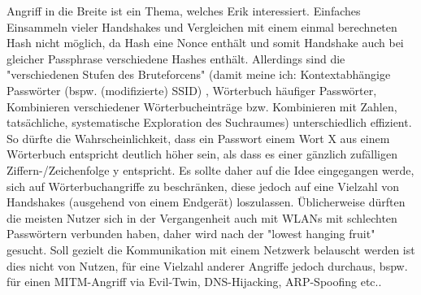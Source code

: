 Angriff in die Breite ist ein Thema, welches Erik interessiert. Einfaches Einsammeln vieler Handshakes und Vergleichen mit einem einmal berechneten Hash nicht möglich, da Hash eine Nonce enthält und somit Handshake auch bei gleicher Passphrase verschiedene Hashes enthält. Allerdings sind die "verschiedenen Stufen des Bruteforcens" (damit meine ich: Kontextabhängige Passwörter (bspw. (modifizierte) SSID) , Wörterbuch häufiger Passwörter, Kombinieren verschiedener Wörterbucheinträge bzw. Kombinieren mit Zahlen, tatsächliche, systematische Exploration des Suchraumes) unterschiedlich effizient. So dürfte die Wahrscheinlichkeit, dass ein Passwort einem Wort X aus einem Wörterbuch entspricht deutlich höher sein, als dass es einer gänzlich zufälligen Ziffern-/Zeichenfolge y entspricht. Es sollte daher auf die Idee eingegangen werde, sich auf Wörterbuchangriffe zu beschränken, diese jedoch auf eine Vielzahl von Handshakes (ausgehend von einem Endgerät) loszulassen. Üblicherweise dürften die meisten Nutzer sich in der Vergangenheit auch mit WLANs mit schlechten Passwörtern verbunden haben, daher wird nach der "lowest hanging fruit" gesucht. Soll gezielt die Kommunikation mit einem Netzwerk belauscht werden ist dies nicht von Nutzen, für eine Vielzahl anderer Angriffe jedoch durchaus, bspw. für einen MITM-Angriff via Evil-Twin, DNS-Hijacking, ARP-Spoofing etc..
